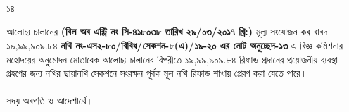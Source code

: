 \documentclass[12pt]{article}
\begin{document}
\\
\\
\\
\begin{minipage}[t]{0.05\linewidth}
১৪।
\end{minipage}
\begin{minipage}[t]{1\linewidth}
আলোচ্য চালানের
\textbf{(বিল অব এন্ট্রি নং সি-৪১৮০৩৮ তারিখ ২৯/০৩/২০১৭ খ্রি:)}
মূল্য সংযোজন কর বাবদ
১৯,৯৯,৯০৯.৮৪
\textbf{নথি নং-এস২-৮০/বিবিধ/সেকশন-৮(এ)/১৯-২০
এর নোট অনুচ্ছেদ-১৩} এ বিজ্ঞ কমিশনার মহোদয়ের
অনুমোদন মোতাবেক আলোচ্য চালানের
বিপরীতে
১৯,৯৯,৯০৯.৮৪
রিফান্ড প্রদানের প্রয়োজনীয় ব্যবস্থা গ্রহণের জন্য
নথির ছায়ানথি সেকশনে সংরক্ষন পূর্বক
মূল নথি রিফান্ড শাখায় প্রেরণ করা যেতে পারে।
\\
\\
সদয় অবগতি ও আদেশার্থে।
\end{minipage}

\thispagestyle{laststyle}
\end{document}
